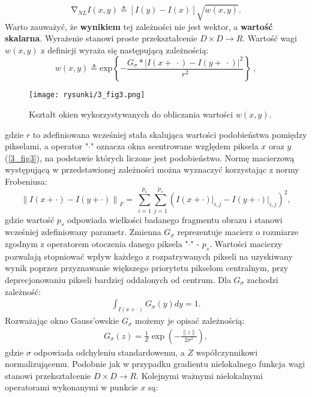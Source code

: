 \documentclass[a4paper,12pt,twoside,openany]{report}
\begin{document}
\begin{equation}
{\mathrm{\nabla }}_{NL}I\left(x,y\right)\triangleq \left[I\left(y\right)-I\left(x\right)\right]\sqrt{w(x,y)}
\label{NLGRAD}
.
\end{equation}
Warto zauważyć, że \textbf{wynikiem} tej zależności nie jest wektor, a \textbf{wartość skalarna}. Wyrażenie stanowi proste przekształcenie $D \times D\longrightarrow R$. Wartość wagi $w(x,y)$ z definicji wyraża się następującą zależnością:
\begin{equation}
w\left(x,y\right)\triangleq {\mathrm{exp} \left\{-\frac{G_{\sigma }*{\left|I\left(x+\ \cdot \right)-I\left(y+\ \cdot \right)\right|}^2}{r^2}\right\}\ }
\label{NLWEIGHT}
,
\end{equation}
\begin{figure}[!h]
	\centering
	\texttt{[image: rysunki/3\_fig3.png]}
	\caption{Kształt okien wykorzystywanych do obliczania wartości $w(x,y)$.}
	\label{3_fig3}
\end{figure}
gdzie $r$ to zdefiniowana wcześniej stała skalująca wartości podobieństwa pomiędzy pikselami, a operator "$\cdot$" oznacza okna scentrowane względem piksela $x$ oraz $y$ (\autoref{3_fig3}), na podstawie których liczone jest podobieństwo. Normę macierzową występującą w przedstawionej zależności można wyznaczyć korzystając z normy Frobeniusa:
\begin{equation}
{\|I\left(x+\cdot \right)-I\left(y+\cdot \right)\|}_F=\ \sum^{p_s}_{i=1}{\sum^{p_s}_{j=1}{{\left(I(x+\cdot)\big|_{i,j}-I(y+\cdot)\big|_{i,j}\right)}^2}}
\label{FROBENIUS}
,
\end{equation}
gdzie wartość $p_s$ odpowiada wielkości badanego fragmentu obrazu i stanowi wcześniej zdefiniowany parametr. Zmienna $G_\sigma$ reprezentuje macierz o rozmiarze zgodnym z operatorem otoczenia danego piksela "$\cdot$" - $p_s$. Wartości macierzy pozwalają stopniować wpływ każdego z rozpatrywanych pikseli na uzyskiwany wynik poprzez przyznawanie większego priorytetu pikselom centralnym, przy deprecjonowaniu pikseli bardziej oddalonych od centrum. Dla $G_\sigma$ zachodzi zależność:
\begin{align}
\int_{I(x+\cdot)}G_{\sigma}(y)dy = 1.
\end{align}
Rozważając okno Gauss'owskie $G_\sigma$ możemy je opisać zależnością:
\begin{align}
G_\sigma(z)=\frac{1}{Z}\exp\left(-\frac{\|z\|}{2\sigma^2}\right),
\label{oknoGaussowskie}
\end{align}
gdzie $\sigma$ odpowiada odchyleniu standardowemu, a $Z$ współczynnikowi normalizującemu. Podobnie jak w przypadku gradientu nielokalnego funkcja wagi stanowi przekształcenie $D \times D\longrightarrow R$. Kolejnymi ważnymi nielokalnymi operatorami wykonanymi w punkcie $x$ są: 
\end{document}
